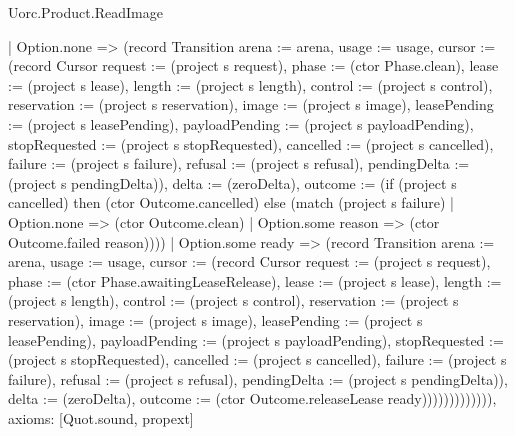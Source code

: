 \begin{lexlean}{Uorc.Product.ReadImage}
\begin{semanticmodule}
{          | Option.none => (record Transition {arena := arena, usage := usage, cursor := (record Cursor {request := (project s request), phase := (ctor Phase.clean), lease := (project s lease), length := (project s length), control := (project s control), reservation := (project s reservation), image := (project s image), leasePending := (project s leasePending), payloadPending := (project s payloadPending), stopRequested := (project s stopRequested), cancelled := (project s cancelled), failure := (project s failure), refusal := (project s refusal), pendingDelta := (project s pendingDelta)}), delta := (zeroDelta), outcome := (if (project s cancelled) then (ctor Outcome.cancelled) else (match (project s failure)
            | Option.none => (ctor Outcome.clean)
            | Option.some reason => (ctor Outcome.failed reason)))})
          | Option.some ready => (record Transition {arena := arena, usage := usage, cursor := (record Cursor {request := (project s request), phase := (ctor Phase.awaitingLeaseRelease), lease := (project s lease), length := (project s length), control := (project s control), reservation := (project s reservation), image := (project s image), leasePending := (project s leasePending), payloadPending := (project s payloadPending), stopRequested := (project s stopRequested), cancelled := (project s cancelled), failure := (project s failure), refusal := (project s refusal), pendingDelta := (project s pendingDelta)}), delta := (zeroDelta), outcome := (ctor Outcome.releaseLease ready)})))))))))))),
  axioms: [Quot.sound, propext]
}


\end{semanticmodule}
\end{lexlean}
